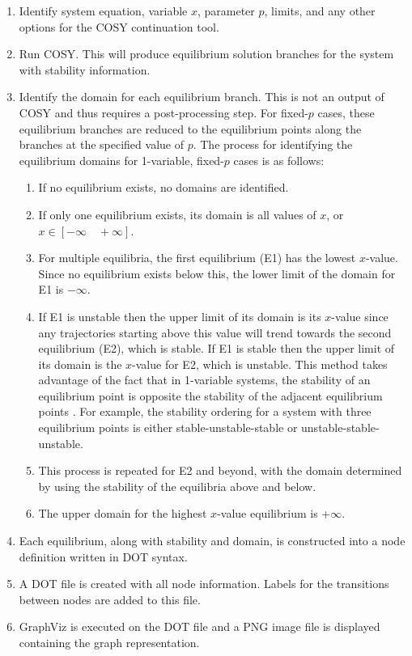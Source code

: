 \documentclass[12pt]{article}
\begin{document}
\begin{enumerate}
\item Identify system equation, variable $x$, parameter $p$, limits, and any other options for the COSY continuation tool.
\item Run COSY. This will produce equilibrium solution branches for the system with stability information.
\item Identify the domain for each equilibrium branch. This is not an output of COSY and thus requires a post-processing step. For fixed-$p$ cases, these equilibrium branches are reduced to the equilibrium points along the branches at the specified value of $p$. The process for identifying the equilibrium domains for 1-variable, fixed-$p$ cases is as follows:
	\begin{enumerate}
	\item If no equilibrium exists, no domains are identified.
	\item If only one equilibrium exists, its domain is all values of $x$, or $x\in [-\infty \quad +\infty]$.
	\item For multiple equilibria, the first equilibrium (E1) has the lowest $x$-value. Since no equilibrium exists below this, the lower limit of the domain for E1 is $-\infty$. 
	\item If E1 is unstable then the upper limit of its domain is its $x$-value since any trajectories starting above this value will trend towards the second equilibrium (E2), which is stable. If E1 is stable then the upper limit of its domain is the $x$-value for E2, which is unstable. This method takes advantage of the fact that in 1-variable systems, the stability of an equilibrium point is opposite the stability of the adjacent equilibrium points \cite{strogatz}. For example, the stability ordering for a system with three equilibrium points is either stable-unstable-stable or unstable-stable-unstable.
	\item This process is repeated for E2 and beyond, with the domain determined by using the stability of the equilibria above and below. 
	\item The upper domain for the highest $x$-value equilibrium is +$\infty$.
	\end{enumerate}
\item Each equilibrium, along with stability and domain, is constructed into a node definition written in DOT syntax. 
\item A DOT file is created with all node information. Labels for the transitions between nodes are added to this file.
\item GraphViz is executed on the DOT file and a PNG image file is displayed containing the graph representation.
\end{enumerate}
\end{document}
